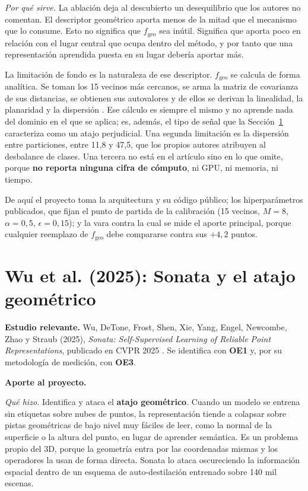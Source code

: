 \emph{Por qué sirve.} La ablación deja al descubierto un desequilibrio que los
autores no comentan. El descriptor geométrico aporta menos de la mitad que el
mecanismo que lo consume. Esto no significa que $f_{\text{geo}}$ sea
inútil. Significa que aporta poco en relación con el lugar central que ocupa dentro
del método, y por tanto que una representación aprendida puesta en su lugar
debería aportar más.

La limitación de fondo es la naturaleza de ese descriptor. $f_{\text{geo}}$ se
calcula de forma analítica. Se toman los 15 vecinos más cercanos, se arma la
matriz de covarianza de sus distancias, se obtienen sus autovalores y de ellos se
derivan la linealidad, la planaridad y la dispersión \cite{zhang2026hyperncd}.
Ese cálculo es siempre el mismo y no aprende nada del dominio en el que se
aplica; es, además, el tipo de señal que la Sección~\ref{sec:sonata} caracteriza
como un atajo perjudicial. Una segunda limitación es la dispersión entre
particiones, entre 11,8 y 47,5, que los propios autores atribuyen al desbalance
de clases. Una tercera no está en el artículo sino en lo que omite, porque \textbf{no
reporta ninguna cifra de cómputo}, ni GPU, ni memoria, ni tiempo.

De aquí el proyecto toma la arquitectura y su código público; los
hiperparámetros publicados, que fijan el punto de partida de la calibración
(15 vecinos, $M=8$, $\alpha=0{,}5$, $\epsilon=0{,}15$); y la vara contra la cual se
mide el aporte principal, porque cualquier reemplazo de $f_{\text{geo}}$ debe
compararse contra sus $+4{,}2$ puntos.

\section[Sonata]{Wu et al. (2025): Sonata y el atajo geométrico}
\label{sec:sonata}

\textbf{Estudio relevante.} Wu, DeTone, Frost, Shen, Xie, Yang, Engel, Newcombe,
Zhao y Straub (2025), \emph{Sonata: Self-Supervised Learning of Reliable Point
Representations}, publicado en CVPR 2025 \cite{wu2025sonata}. Se identifica con
\textbf{OE1} y, por su metodología de medición, con \textbf{OE3}.

\textbf{Aporte al proyecto.}

\emph{Qué hizo.} Identifica y ataca el \textbf{atajo geométrico}. Cuando un
modelo se entrena sin etiquetas sobre nubes de puntos, la representación tiende a
colapsar sobre pistas geométricas de bajo nivel muy fáciles de leer, como la
normal de la superficie o la altura del punto, en lugar de aprender semántica. Es
un problema propio del 3D, porque la geometría entra por las coordenadas mismas y
los operadores la usan de forma directa. Sonata lo ataca oscureciendo la
información espacial dentro de un esquema de auto-destilación entrenado sobre 140
mil escenas.

